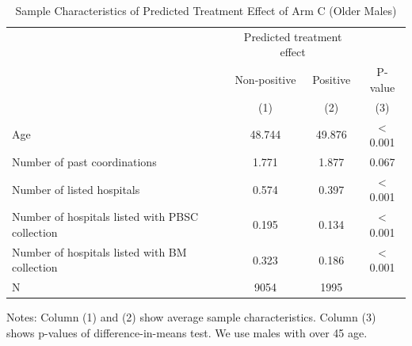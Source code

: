 \documentclass[
]{article}
\begin{document}
\begin{table}[H]

\caption{\label{tab:rcf-older-male}Sample Characteristics of Predicted Treatment Effect of Arm C (Older Males)}
\centering
\fontsize{9}{11}\selectfont
\fontsize{9}{11}\selectfont
\begin{threeparttable}
\begin{tabular}[t]{lccc}
\toprule
\multicolumn{1}{c}{ } & \multicolumn{2}{c}{Predicted treatment effect} & \multicolumn{1}{c}{ } \\
\cmidrule(l{3pt}r{3pt}){2-3}
\multicolumn{1}{c}{ } & \multicolumn{1}{c}{Non-positive} & \multicolumn{1}{c}{Positive} & \multicolumn{1}{c}{P-value} \\
\cmidrule(l{3pt}r{3pt}){2-2} \cmidrule(l{3pt}r{3pt}){3-3} \cmidrule(l{3pt}r{3pt}){4-4}
 & (1) & (2) & (3)\\
\midrule
Age & 48.744 & 49.876 & < 0.001\\
Number of past coordinations & 1.771 & 1.877 & 0.067\\
Number of listed hospitals & 0.574 & 0.397 & < 0.001\\
Number of hospitals listed with PBSC collection & 0.195 & 0.134 & < 0.001\\
Number of hospitals listed with BM collection & 0.323 & 0.186 & < 0.001\\
N & 9054 & 1995 & \\
\bottomrule
\end{tabular}
\begin{tablenotes}
\item Notes: Column (1) and (2) show average sample characteristics. Column (3) shows p-values of difference-in-means test. We use males with over 45 age.
\end{tablenotes}
\end{threeparttable}
\end{table}
\end{document}
